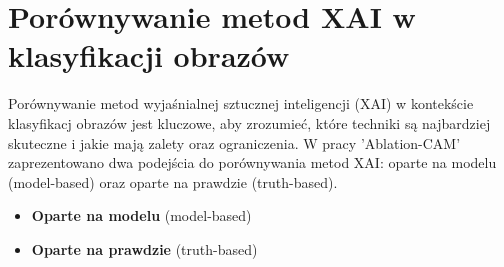 \section*{Porównywanie metod XAI w klasyfikacji obrazów}
Porównywanie metod wyjaśnialnej sztucznej inteligencji (XAI) w kontekście klasyfikacj obrazów jest kluczowe, aby zrozumieć, które techniki są najbardziej skuteczne i jakie mają zalety oraz ograniczenia.
W pracy 'Ablation-CAM' \cite{9093360} zaprezentowano dwa podejścia do porównywania metod XAI: oparte na modelu (model-based) oraz oparte na prawdzie (truth-based).
\begin{itemize}
	\item \textbf{Oparte na modelu} (model-based)
	\item \textbf{Oparte na prawdzie} (truth-based)
\end{itemize}


